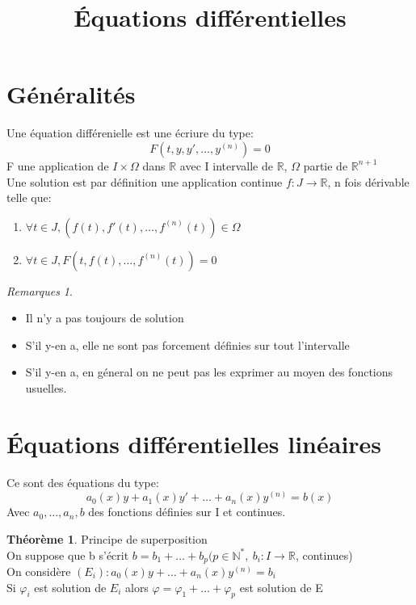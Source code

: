 \documentclass[fleqn]{article}
\title{\'Equations diff\'erentielles}
\date{}
\theoremstyle{definition} \newtheorem*{defi}{D\'efinition}
\theoremstyle{definition} \newtheorem*{theo}{Th\'eor\`eme}
\theoremstyle{remark} \newtheorem*{rqs}{Remarques}
\begin{document}
\maketitle

\section{G\'en\'eralit\'es}
Une \'equation diff\'erenielle est une \'ecriure du type:
\[F(t, y, y', \hdots, y^{(n)}) = 0\]
F une application de $I \times \Omega$ dans $\mathbb{R}$ avec I intervalle de $\mathbb{R}$, $\Omega$ partie de $\mathbb{R}^{n+1}$\\
Une solution est par d\'efinition une application continue $f:J\rightarrow \mathbb{R}$, n fois d\'erivable telle que:
\begin{enumerate}
	\item $\forall t \in J, (f(t), f'(t), \hdots, f^{(n)}(t)) \in \Omega$
	\item $\forall t \in J, F(t, f(t), \hdots, f^{(n)}(t)) = 0$
\end{enumerate}

\begin{rqs} $ $
	\begin{itemize}
		\item Il n'y a pas toujours de solution
		\item S'il y-en a, elle ne sont pas forcement d\'efinies sur tout l'intervalle
		\item S'il y-en a, en g\'eneral on ne peut pas les exprimer au moyen des fonctions usuelles.
	\end{itemize}
\end{rqs}

\section{\'Equations diff\'erentielles lin\'eaires}
Ce sont des \'equations du type:
\[a_0(x)y + a_1(x)y' + \hdots + a_n(x)y^{(n)} = b(x)\]
Avec $a_0, \hdots, a_n, b$ des fonctions d\'efinies sur I et continues.\\

\begin{theo} Principe de superposition \\
	On suppose que b s'\'ecrit $b = b_1 + \hdots + b_p (p \in \mathbb{N}^{*},\ b_i : I \rightarrow \mathbb{R}$,  continues)\\
	On consid\`ere $(E_i): a_0(x)y + \hdots + a_n(x) y^{(n)} = b_i$ \\
	Si $\varphi_i$ est solution de $E_i$ alors $\varphi = \varphi_1 + \hdots + \varphi_p$ est solution de E
\end{theo}
\end{document}
